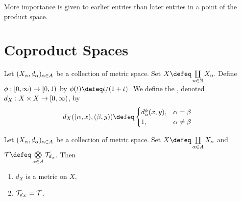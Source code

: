 \documentclass{book}
\begin{document}
\begin{note}
	 More importance is given to earlier entries than later entries in a point of the product space.  
\end{note}
















































\newpage
\section{Coproduct Spaces}

\begin{defn} 
	Let $(X_{\alpha}, d_{\alpha})_{\alpha \in A}$ be a collection of metric space. Set $X \defeq \coprod\limits_{n \in \N} X_n$. Define $\phi:[0,\infty) \rightarrow [0,1)$ by $\phi(t) \defeq t/(1 + t)$. We define the , denoted $d_X: X \times X \rightarrow [0,\infty)$, by  
	\[
	d_X((\al, x), (\be, y)) \defeq
	\begin{cases}
		d_{\al}^{\phi}(x, y), & \al = \be \\
		1, & \al \neq \be 
	\end{cases}
	\]
\end{defn}

\begin{ex} 
	Let $(X_{\alpha}, d_{\alpha})_{\alpha \in A}$ be a collection of metric space. Set $X \defeq \coprod\limits_{\al \in A} X_{\al}$ and $\MT \defeq \bigotimes\limits_{\al \in A} \MT_{d_{\al}}$. Then 
	\begin{enumerate}
		\item $d_X$ is a metric on $X$,
		\item $\mathcal{T}_{d_X} = \mathcal{T}$. 
	\end{enumerate}
\end{ex}
\end{document}
